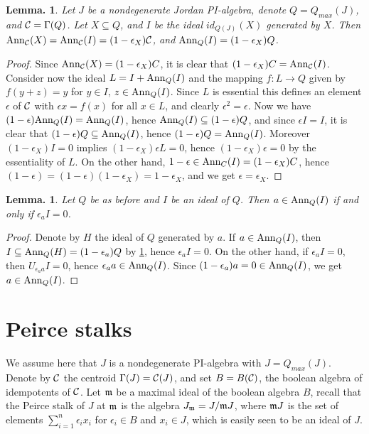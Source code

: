 \documentclass[a4paper,twoside,11pt]{article}
\theoremstyle{plain}
\theoremstyle{miestilo}
\newtheorem{lema}[subsection]{Lemma.}
\theoremstyle{misnotas}
\begin{document}
\begin{lema}\label{annid}Let $J$ be a nondegenerate Jordan PI-algebra, denote $Q =
Q_{max}(J)$, and $\mathcal C = \Gamma(Q)$. Let $X\subseteq Q$, and $I$ be the ideal
$id_{Q(J)}(X)$ generated by $X$. Then ${\rm Ann}_\mathcal C(X) ={\rm Ann}_\mathcal C(I) =
(1-\epsilon_X)\mathcal C$, and ${\rm Ann}_Q(I)= (1-\epsilon_X)Q$.\end{lema}

\begin{proof}Since ${\rm Ann}_\mathcal C(X) = (1-\epsilon_X)C$, it is clear that $(1-\epsilon_X)C = {\rm
Ann}_\mathcal C(I)$. Consider now the ideal $L = I +{\rm Ann}_Q(I)$ and the mapping $f: L \rightarrow Q$
given by $f(y+z) = y$ for $y \in I$, $z\in {\rm Ann}_Q(I)$. Since $L$ is essential this defines an element $\epsilon$ of $\cal C$ with $\epsilon x = f(x)$ for all $x \in L$, and clearly $\epsilon^2 =
\epsilon$. Now we have $(1-\epsilon){\rm Ann}_Q(I) = {\rm Ann}_Q(I)$, hence ${\rm Ann}_Q(I)
\subseteq (1-\epsilon)Q$, and since $\epsilon I = I$, it is clear that $(1-\epsilon)Q
\subseteq {\rm Ann}_Q(I)$, hence $(1-\epsilon)Q = {\rm Ann}_Q(I)$. Moreover
$(1-\epsilon_X)I = 0$ implies $(1-\epsilon_X)\epsilon L= 0$, hence
$(1-\epsilon_X)\epsilon= 0$ by the essentiality of $L$. On the other hand, $1-\epsilon \in
{\rm Ann}_C(I) = (1-\epsilon_X)C$, hence $(1-\epsilon) = (1-\epsilon)(1-\epsilon_X)=
1-\epsilon_X$, and we get $\epsilon=\epsilon_X$.\end{proof}

\begin{lema}\label{epsU}Let $Q$ be as before and $I$ be an ideal of $Q$. Then $a\in {\rm Ann}_Q(I)$
if and only if $\epsilon_a I = 0$.\end{lema}

\begin{proof} Denote by $H$ the ideal of $Q$ generated by $a$. If $a \in {\rm Ann}_Q(I)$, then $I
\subseteq {\rm Ann}_Q(H) = (1-\epsilon_a)Q$ by \ref{annid}, hence $\epsilon_a I = 0$. On the
other hand, if $\epsilon_a I = 0$, then $U_{\epsilon_a a}I = 0$, hence $\epsilon_a a \in
{\rm Ann}_Q(I)$. Since $(1-\epsilon_a)a = 0\in {\rm Ann}_Q(I)$, we get $a \in {\rm
Ann}_Q(I)$.\end{proof}

\section{Peirce stalks}

We assume here that $J$ is a nondegenerate PI-algebra with $J = Q_{max}(J)$. Denote by
$\mathcal C$ the centroid $\Gamma(J) = \mathcal C(J)$, and set $B = B(\mathcal C)$, the boolean algebra of
idempotents of $\mathcal C$. Let $\frak m$ be a maximal ideal of the boolean algebra $B$, recall that
the Peirce stalk of $J$ at $\frak m$ is the algebra $J_{\frak m} =J/\frak mJ$, where $\frak m J$ is
the set of elements $\sum_{i=1}^n\epsilon_i x_i$ for $\epsilon_i \in B$ and $x_i\in J$,
which is easily seen to be an ideal of $J$.
\end{document}

